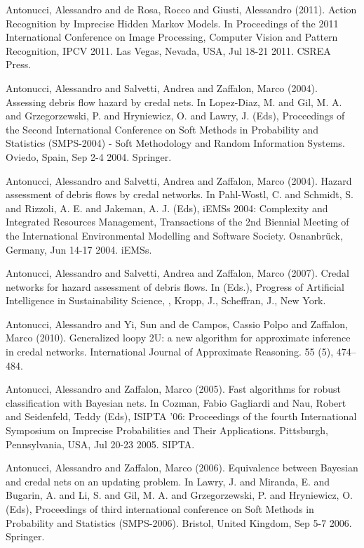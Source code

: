 \begin{cventries}
\begin{cvitems}
\item Antonucci, Alessandro and de Rosa, Rocco and Giusti, Alessandro (2011).   Action Recognition by Imprecise Hidden Markov Models.   In Proceedings of the 2011 International Conference on Image Processing, Computer Vision and Pattern Recognition, IPCV 2011.   Las Vegas, Nevada, USA,   Jul 18-21 2011.   CSREA Press.
\item Antonucci, Alessandro and Salvetti, Andrea and Zaffalon, Marco (2004).   Assessing debris flow hazard by credal nets.   In Lopez-Diaz, M. and Gil, M. A. and Grzegorzewski, P. and Hryniewicz, O. and Lawry, J. (Eds), Proceedings of the Second International Conference on Soft Methods in Probability and Statistics (SMPS-2004) - Soft Methodology and Random Information Systems.   Oviedo, Spain,   Sep 2-4 2004.   Springer.
\item Antonucci, Alessandro and Salvetti, Andrea and Zaffalon, Marco (2004).   Hazard assessment of debris flows by credal networks.   In Pahl-Wostl, C. and Schmidt, S. and Rizzoli, A. E. and Jakeman, A. J. (Eds), iEMSs 2004: Complexity and Integrated Resources Management, Transactions of the 2nd Biennial Meeting of the International Environmental Modelling and Software Society.   Osnanbrück, Germany,   Jun 14-17 2004.   iEMSs.
\item Antonucci, Alessandro and Salvetti, Andrea and Zaffalon, Marco (2007).   Credal networks for hazard assessment of debris flows.   In (Eds.), Progress of Artificial Intelligence in Sustainability Science, , Kropp, J., Scheffran, J., New York.
\item Antonucci, Alessandro and Yi, Sun and de Campos, Cassio Polpo and Zaffalon, Marco (2010).   Generalized loopy 2U: a new algorithm for approximate inference in credal networks.   International Journal of Approximate Reasoning. 55 (5), 474–484.
\item Antonucci, Alessandro and Zaffalon, Marco (2005).   Fast algorithms for robust classification with Bayesian nets.   In Cozman, Fabio Gagliardi and Nau, Robert and Seidenfeld, Teddy (Eds), ISIPTA ’06: Proceedings of the fourth International Symposium on Imprecise Probabilities and Their Applications.   Pittsburgh, Pennsylvania, USA,   Jul 20-23 2005.   SIPTA.
\item Antonucci, Alessandro and Zaffalon, Marco (2006).   Equivalence between Bayesian and credal nets on an updating problem.   In Lawry, J. and Miranda, E. and Bugarin, A. and Li, S. and Gil, M. A. and Grzegorzewski, P. and Hryniewicz, O. (Eds), Proceedings of third international conference on Soft Methods in Probability and Statistics (SMPS-2006).   Bristol, United Kingdom,   Sep 5-7 2006.   Springer.

\end{cvitems}
\end{cventries}
